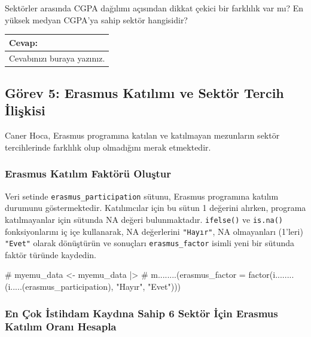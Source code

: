 \documentclass[
  11pt,
  a4paper,
  DIV=11,
  numbers=noendperiod]{scrartcl}
\newenvironment{Shaded}{\begin{snugshade}}{\end{snugshade}}
\newcommand{\CommentTok}[1]{\textcolor[rgb]{0.37,0.37,0.37}{#1}}
\begin{document}
Sektörler arasında CGPA dağılımı açısından dikkat çekici bir farklılık
var mı? En yüksek medyan CGPA'ya sahip sektör hangisidir?

\begin{longtable}[]{@{}l@{}}
\toprule\noalign{}
Cevap: \\
\midrule\noalign{}
\endhead
\bottomrule\noalign{}
\endlastfoot
Cevabınızı buraya yazınız. \\
\end{longtable}

\subsection{Görev 5: Erasmus Katılımı ve Sektör Tercih
İlişkisi}\label{guxf6rev-5-erasmus-katux131lux131mux131-ve-sektuxf6r-tercih-iliux15fkisi}

Caner Hoca, Erasmus programına katılan ve katılmayan mezunların sektör
tercihlerinde farklılık olup olmadığını merak etmektedir.

\subsubsection{Erasmus Katılım Faktörü
Oluştur}\label{erasmus-katux131lux131m-faktuxf6ruxfc-oluux15ftur}

Veri setinde \texttt{erasmus\_participation} sütunu, Erasmus programına
katılım durumunu göstermektedir. Katılımcılar için bu sütun 1 değerini
alırken, programa katılmayanlar için sütunda NA değeri bulunmaktadır.
\texttt{ifelse()} ve \texttt{is.na()} fonksiyonlarını iç içe kullanarak,
NA değerlerini \texttt{"Hayır"}, NA olmayanları (1'leri) \texttt{"Evet"}
olarak dönüştürün ve sonuçları \texttt{erasmus\_factor} isimli yeni bir
sütunda faktör türünde kaydedin.

\begin{Shaded}
\begin{Highlighting}[]
\CommentTok{\# myemu\_data \textless{}{-} myemu\_data |\textgreater{}}
\CommentTok{\#   m........(erasmus\_factor = factor(i........(i.....(erasmus\_participation), "Hayır", "Evet")))}
\end{Highlighting}
\end{Shaded}

\subsubsection{En Çok İstihdam Kaydına Sahip 6 Sektör İçin Erasmus
Katılım Oranı
Hesapla}\label{en-uxe7ok-istihdam-kaydux131na-sahip-6-sektuxf6r-iuxe7in-erasmus-katux131lux131m-oranux131-hesapla}
\end{document}
